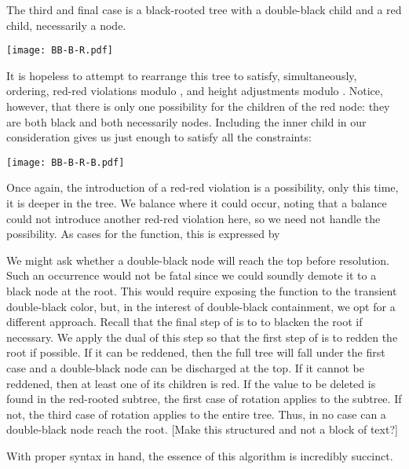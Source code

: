 \documentclass[preprint]{sigplanconf}
\begin{document}
The third and final case is a black-rooted tree with a double-black child and a red child, necessarily a node.
\begin{center}
\texttt{[image: BB-B-R.pdf]}
\end{center}
It is hopeless to attempt to rearrange this tree to satisfy, simultaneously, ordering, red-red violations modulo , and height adjustments modulo . Notice, however, that there is only one possibility for the children of the red node: they are both black and both necessarily nodes. Including the inner child in our consideration gives us just enough to satisfy all the constraints:
\begin{center}
\texttt{[image: BB-B-R-B.pdf]}
\end{center}
Once again, the introduction of a red-red violation is a possibility, only this time, it is deeper in the tree. We balance where it could occur, noting that a balance could not introduce another red-red violation here, so we need not handle the possibility. As cases for the  function, this is expressed by
\begin{schemedisplay}
[(B (BB? a-w-b) x (R (B c y d) z e))
 (B (balance (B (R (-B a-w-b) x c) y d)) z e)]
[(B (R a w (B b x c)) y (BB? d-z-e))
 (B a w (balance (B b x (R c y (-B d-z-e)))))]
\end{schemedisplay}

We might ask whether a double-black node will reach the top before resolution. Such an occurrence would not be fatal since we could soundly demote it to a black node at the root. This would require exposing the  function to the transient double-black color, but, in the interest of double-black containment, we opt for a different approach. Recall that the final step of  is to to blacken the root if necessary. We apply the dual of this step so that the first step of  is to redden the root if possible. If it can be reddened, then the full tree will fall under the first case and a double-black node can be discharged at the top. If it cannot be reddened, then at least one of its children is red. If the value to be deleted is found in the red-rooted subtree, the first case of rotation applies to the subtree. If not, the third case of rotation applies to the entire tree. Thus, in no case can a double-black node reach the root. [Make this structured and not a block of text?]

With proper syntax in hand, the essence of this algorithm is incredibly succinct.
\end{document}
